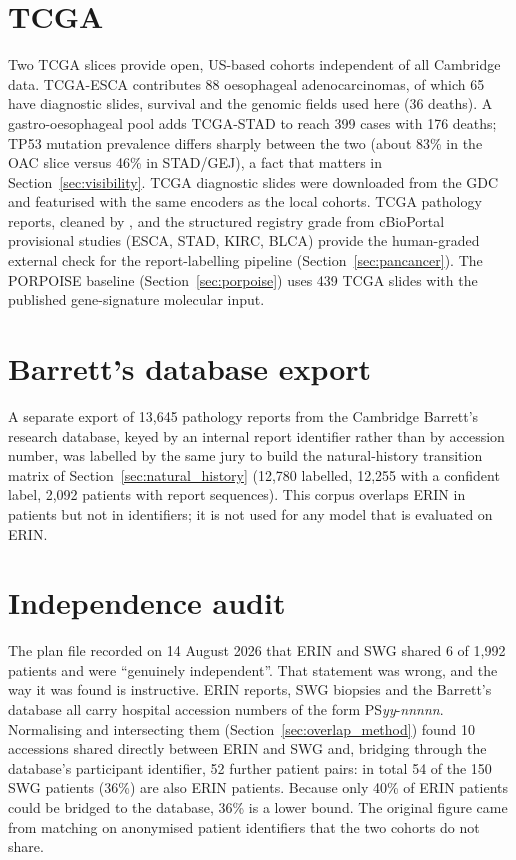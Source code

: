 \section{TCGA}
\label{sec:tcga}

Two TCGA slices provide open, US-based cohorts independent of all Cambridge data. TCGA-ESCA contributes 88 oesophageal adenocarcinomas, of which 65 have diagnostic slides, survival and the genomic fields used here (36 deaths). A gastro-oesophageal pool adds TCGA-STAD to reach 399 cases with 176 deaths; TP53 mutation prevalence differs sharply between the two (about 83\% in the OAC slice versus 46\% in STAD/GEJ), a fact that matters in Section~\ref{sec:visibility}. TCGA diagnostic slides were downloaded from the GDC and featurised with the same encoders as the local cohorts. TCGA pathology reports, cleaned by \citet{kefeli2024tcgareports}, and the structured registry grade from cBioPortal provisional studies (ESCA, STAD, KIRC, BLCA) provide the human-graded external check for the report-labelling pipeline (Section~\ref{sec:pancancer}). The PORPOISE baseline (Section~\ref{sec:porpoise}) uses 439 TCGA slides with the published gene-signature molecular input.

\section{Barrett's database export}

A separate export of 13,645 pathology reports from the Cambridge Barrett's research database, keyed by an internal report identifier rather than by accession number, was labelled by the same jury to build the natural-history transition matrix of Section~\ref{sec:natural_history} (12,780 labelled, 12,255 with a confident label, 2,092 patients with report sequences). This corpus overlaps ERIN in patients but not in identifiers; it is not used for any model that is evaluated on ERIN.

\section{Independence audit}
\label{sec:independence}

The plan file recorded on 14 August 2026 that ERIN and SWG shared 6 of 1,992 patients and were ``genuinely independent''. That statement was wrong, and the way it was found is instructive. ERIN reports, SWG biopsies and the Barrett's database all carry hospital accession numbers of the form PS\emph{yy}-\emph{nnnnn}. Normalising and intersecting them (Section~\ref{sec:overlap_method}) found 10 accessions shared directly between ERIN and SWG and, bridging through the database's participant identifier, 52 further patient pairs: in total 54 of the 150 SWG patients (36\%) are also ERIN patients. Because only 40\% of ERIN patients could be bridged to the database, 36\% is a lower bound. The original figure came from matching on anonymised patient identifiers that the two cohorts do not share.

